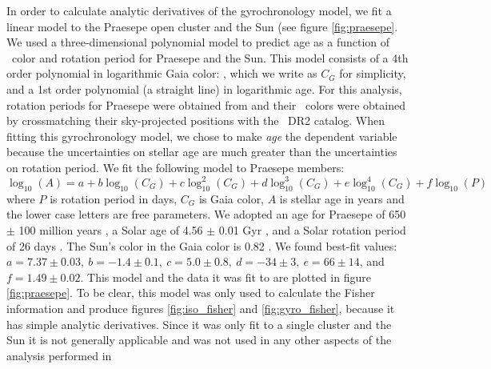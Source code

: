 In order to calculate analytic derivatives of the gyrochronology model, we
fit a linear model to the Praesepe open cluster and the Sun (see figure
\ref{fig:praesepe}.
We used a three-dimensional polynomial model to predict age as a
function of \gaia\ color and rotation period for Praesepe and the Sun.
This model consists of a 4th order polynomial in logarithmic Gaia color:
\gcolor, which we write as $C_G$ for simplicity, and a 1st order polynomial (a
straight line) in logarithmic age.
For this analysis, rotation periods for Praesepe were obtained from
\citet{douglas2017} and their \gaia\ colors were obtained by crossmatching
their sky-projected positions with the \gaia\ DR2 catalog.
When fitting this gyrochronology model, we chose to make {\it age} the
dependent variable because the uncertainties on stellar age are much greater
than the uncertainties on rotation period.
We fit the following model to Praesepe members:
\begin{equation}
    \log_{10}(A) = a + b\log_{10}(C_G) + c\log_{10}^2(C_G) +
    d\log_{10}^3(C_G) + e\log_{10}^4(C_G) + f\log_{10}(P)
\label{eqn:gyro_age_praesepe}
\end{equation}
where $P$ is rotation period in days, $C_G$ is Gaia color, $A$ is stellar age
in years and the lower case letters are free parameters.
We adopted an age for Praesepe of 650 $\pm$ 100 million years
\citep{fossati2008, gossage2018}, a Solar age of 4.56 $\pm$ 0.01 Gyr
\citep{connelly2012}, and a Solar rotation period of 26 days \citep[][Morris
\etal, in prep]{balthasar1986, howe2000}.
The Sun's color in the Gaia color is 0.82 \citep{casagrande2018}.
We found best-fit values: $a = 7.37 \pm 0.03,~b = -1.4 \pm 0.1,~c = 5.0 \pm
0.8,~d = -34 \pm 3,~e = 66 \pm 14$, and $f = 1.49 \pm 0.02$.
This model and the data it was fit to are plotted in figure
\ref{fig:praesepe}.
To be clear, this model was only used to calculate the Fisher information and
produce figures \ref{fig:iso_fisher} and \ref{fig:gyro_fisher}, because it has
simple analytic derivatives.
Since it was only fit to a single cluster and the Sun it is not generally
applicable and was not used in any other aspects of the analysis performed in
